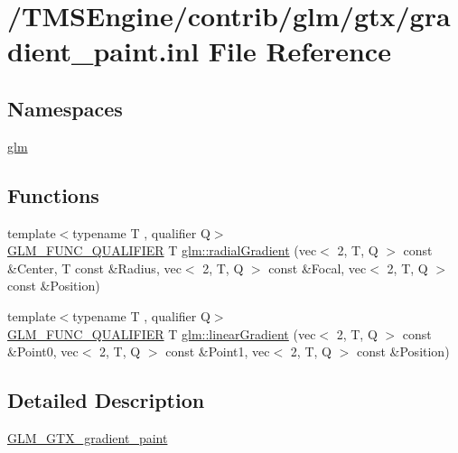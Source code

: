 \hypertarget{gradient__paint_8inl}{}\section{/\+T\+M\+S\+Engine/contrib/glm/gtx/gradient\+\_\+paint.inl File Reference}
\label{gradient__paint_8inl}
\subsection*{Namespaces}
\begin{DoxyCompactItemize}
\item 
 \hyperlink{namespaceglm}{glm}
\end{DoxyCompactItemize}
\subsection*{Functions}
\begin{DoxyCompactItemize}
\item 
{\footnotesize template$<$typename T , qualifier Q$>$ }\\\hyperlink{setup_8hpp_a33fdea6f91c5f834105f7415e2a64407}{G\+L\+M\+\_\+\+F\+U\+N\+C\+\_\+\+Q\+U\+A\+L\+I\+F\+I\+ER} T \hyperlink{group__gtx__gradient__paint_gaaecb1e93de4cbe0758b882812d4da294}{glm\+::radial\+Gradient} (vec$<$ 2, T, Q $>$ const \&Center, T const \&Radius, vec$<$ 2, T, Q $>$ const \&Focal, vec$<$ 2, T, Q $>$ const \&Position)
\item 
{\footnotesize template$<$typename T , qualifier Q$>$ }\\\hyperlink{setup_8hpp_a33fdea6f91c5f834105f7415e2a64407}{G\+L\+M\+\_\+\+F\+U\+N\+C\+\_\+\+Q\+U\+A\+L\+I\+F\+I\+ER} T \hyperlink{group__gtx__gradient__paint_ga849241df1e55129b8ce9476200307419}{glm\+::linear\+Gradient} (vec$<$ 2, T, Q $>$ const \&Point0, vec$<$ 2, T, Q $>$ const \&Point1, vec$<$ 2, T, Q $>$ const \&Position)
\end{DoxyCompactItemize}


\subsection{Detailed Description}
\hyperlink{group__gtx__gradient__paint}{G\+L\+M\+\_\+\+G\+T\+X\+\_\+gradient\+\_\+paint} 